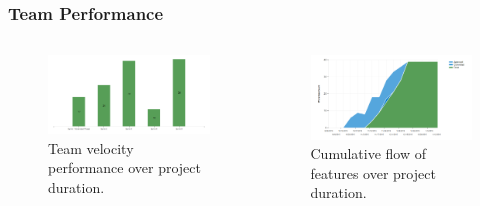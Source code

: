 \documentclass[10pt, compress]{beamer}
\begin{document}
\begin{frame}[fragile]
  \frametitle{Team Performance}
  

   
    \begin{columns}[T,onlytextwidth]
    \hspace*{-10pt}
    
	   	\begin{center}
   
\begin{figure}[!ht]
  \centering
  \includegraphics[width=1.1\textwidth]{Velocity.png}
  \caption{Team velocity performance over project duration.}
\end{figure}

  \end{center}

 \begin{center}
\begin{figure}[!ht]
  \centering
  \includegraphics[width=1.1\textwidth]{CumulativeFlow.png}
  \caption{Cumulative flow of features over project duration.}
\end{figure}
  \end{center}

  \end{columns}
   
\end{frame}
\end{document}

